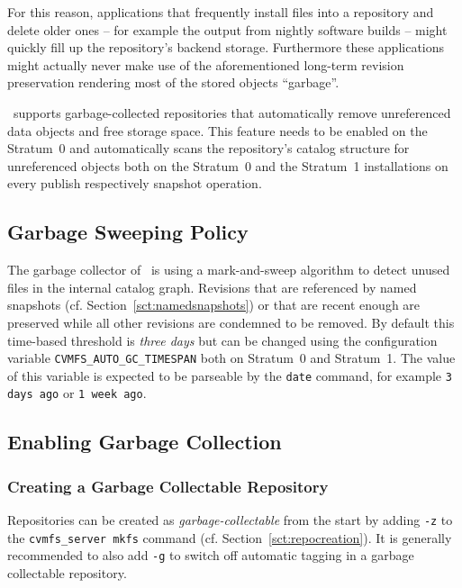 For this reason, applications that frequently install files into a repository and delete older ones -- for example the output from nightly software builds -- might quickly fill up the repository's backend storage.
Furthermore these applications might actually never make use of the aforementioned long-term revision preservation rendering most of the stored objects ``garbage''.

\cvmfs\ supports garbage-collected repositories that automatically remove unreferenced data objects and free storage space.
This feature needs to be enabled on the Stratum~0 and automatically scans the repository's catalog structure for unreferenced objects both on the Stratum~0 and the Stratum~1 installations on every publish respectively snapshot operation.

\subsection{Garbage Sweeping Policy}
The garbage collector of \cvmfs\ is using a mark-and-sweep algorithm to detect unused files in the internal catalog graph.
%
Revisions that are referenced by named snapshots (cf. Section~\ref{sct:namedsnapshots}) or that are recent enough are preserved while all other revisions are condemned to be removed.
By default this time-based threshold is \emph{three days} but can be changed using the configuration variable \texttt{CVMFS\_AUTO\_GC\_TIMESPAN} both on Stratum~0 and Stratum~1.
The value of this variable is expected to be parseable by the \texttt{date} command, for example \texttt{3 days ago} or \texttt{1 week ago}.

\subsection{Enabling Garbage Collection}
\label{sct:enablegc}

\subsubsection{Creating a Garbage Collectable Repository}
Repositories can be created as \emph{garbage-collectable} from the start by adding \texttt{-z} to the \texttt{cvmfs\_server mkfs} command (cf. Section~\ref{sct:repocreation}).
It is generally recommended to also add \texttt{-g} to switch off automatic tagging in a garbage collectable repository.

